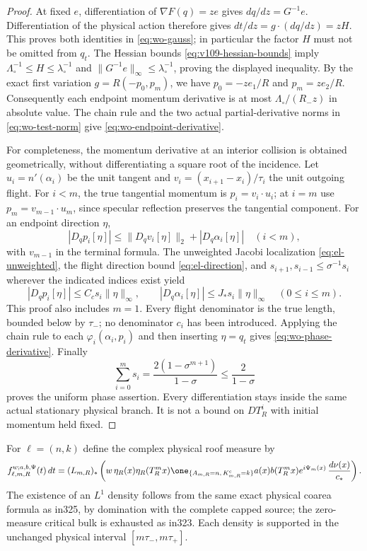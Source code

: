 \begin{proof}
At fixed $e$, differentiation of $\nabla F(q)=ze$ gives
$dq/dz=G^{-1}e$.  Differentiation of the physical action therefore
gives $dt/dz=g\cdot(dq/dz)=zH$.  This proves both identities in
\eqref{eq:wo-gauss}; in particular the factor $H$ must not be
omitted from $q_t$.  The Hessian bounds
\eqref{eq:v109-hessian-bounds} imply
$\Lambda_\circ^{-1}\le H\le\lambda_\circ^{-1}$ and
$\|G^{-1}e\|_\infty\le\lambda_\circ^{-1}$, proving the displayed
inequality.  By the exact first variation
$g=R(-p_0,p_m)$, we have $p_0=-ze_1/R$ and $p_m=ze_2/R$.
Consequently each endpoint momentum derivative is at most
$\Lambda_\circ/(R_-z)$ in absolute value.  The chain rule and the
two actual partial-derivative norms in \eqref{eq:wo-test-norm}
give \eqref{eq:wo-endpoint-derivative}.

For completeness, the momentum derivative at an interior collision
is obtained geometrically, without differentiating a square root
of the incidence.  Let $u_i=n'(\alpha_i)$ be the unit tangent and
$v_i=(x_{i+1}-x_i)/\tau_i$ the unit outgoing flight.  For $i<m$,
the true tangential momentum is $p_i=v_i\cdot u_i$; at $i=m$
use $p_m=v_{m-1}\cdot u_m$, since specular reflection preserves
the tangential component.  For an endpoint direction $\eta$,
\[
 |D_qp_i[\eta]|
 \le \|D_qv_i[\eta]\|_2+|D_q\alpha_i[\eta]|
 \quad(i<m),
\]
with $v_{m-1}$ in the terminal formula.  The unweighted Jacobi
localization \eqref{eq:el-unweighted}, the flight direction bound
\eqref{eq:el-direction}, and
$s_{i+1},s_{i-1}\le\sigma^{-1}s_i$ wherever the indicated
indices exist yield
\begin{equation}\label{eq:wo-interior-momentum}
 |D_qp_i[\eta]|\le C_c s_i\|\eta\|_\infty,
 \qquad |D_q\alpha_i[\eta]|\le J_*s_i\|\eta\|_\infty
 \quad(0\le i\le m).
\end{equation}
This proof also includes $m=1$.  Every flight denominator is the
true length, bounded below by $\tau_-$; no denominator $c_i$
has been introduced.  Applying the chain rule to each
$\varphi_i(\alpha_i,p_i)$ and then inserting $\eta=q_t$ gives
\eqref{eq:wo-phase-derivative}.  Finally
\[
 \sum_{i=0}^m s_i
 =\frac{2(1-\sigma^{m+1})}{1-\sigma}
 \le\frac2{1-\sigma}
\]
proves the uniform phase assertion.  Every differentiation stays
inside the same actual stationary physical branch.  It is not a
bound on $D T_R^i$ with initial momentum held fixed.
\end{proof}

For $\ell=(n,k)$ define the complex physical roof measure by
\begin{equation}\label{eq:wo-measures}
 f^{w;a,b,\Psi}_{\ell,m,R}(t)\,dt
 =(L_{m,R})_*\left(
 w\,\eta_R(x)\eta_R(T_R^mx)
 \one_{\{A_{m,R}=n,\,K^{\rm c}_{m,R}=k\}}
 a(x)b(T_R^mx)e^{i\Psi_m(x)}\,\frac{d\nu(x)}{c_*}
 \right).
\end{equation}
The existence of an $L^1$ density follows from the same exact
physical coarea formula as in325, by domination with the complete
capped source; the zero-measure critical bulk is exhausted as in323.
Each density is supported in the unchanged physical interval
$[m\tau_-,m\tau_+]$.

